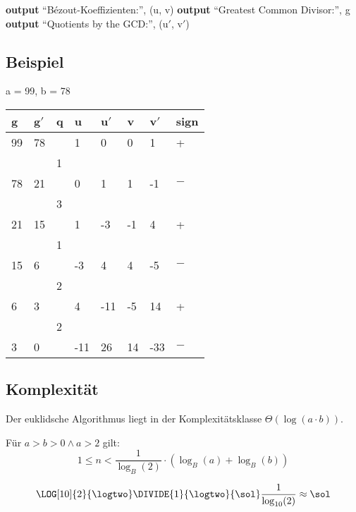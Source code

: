 \documentclass[a4paper, ngerman, landscape, fleqn]{article}
\begin{document}
\begin{multicols*}{3}
\begin{algorithmic}
        \State \textbf{output} ``Bézout-Koeffizienten:'', (u, v)
        \State \textbf{output} ``Greatest Common Divisor:'', g
        \State \textbf{output} ``Quotients by the GCD:'', (u$'$, v$'$)
    \EndFunction
\end{algorithmic}

\subsection*{Beispiel}
a = 99, b = 78
\vspace{1ex}

\begin{tabularx}{\linewidth}{XXXXXXXX}
    \hline
     g & g$'$ & q &   u & u$'$ &  v & v$'$ & sign \\
    \hline
    99 &   78 &   &   1 &    0 &  0 &    1 &    + \\
       &      & 1 &     &      &    &      &      \\
    78 &   21 &   &   0 &    1 &  1 &   -1 &   $-$\\
       &      & 3 &     &      &    &      &      \\
    21 &   15 &   &   1 &   -3 & -1 &    4 &    + \\
       &      & 1 &     &      &    &      &      \\
    15 &    6 &   &  -3 &    4 &  4 &   -5 &   $-$\\
       &      & 2 &     &      &    &      &      \\
     6 &    3 &   &   4 &  -11 & -5 &   14 &    + \\
       &      & 2 &     &      &    &      &      \\
     3 &    0 &   & -11 &   26 & 14 &  -33 &   $-$\\
    \hline
\end{tabularx}

\subsection*{Komplexität}
Der euklidsche Algorithmus liegt in der Komplexitätsklasse $\Theta(\log(a \cdot b))$.

Für $a > b > 0 \wedge a > 2$ gilt:
\begin{equation*}
    1 \leq n < \frac{1}{\log_B(2)} \cdot \left(\log_B(a) + \log_B(b)\right)
\end{equation*}

\begin{equation*}
    \LOG[10]{2}{\logtwo}
    \DIVIDE{1}{\logtwo}{\sol}
    \frac{1}{\log_{10}(2)}
    \approx \sol
\end{equation*}


\end{multicols*}
\end{document}
